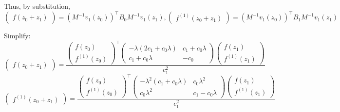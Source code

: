 \documentclass[]{article}
\newcommand{\pqty}[1]{{\left(#1\right)}}
\numberwithin{equation}{section}
\begin{document}
	Thus, by substitution,
	\begin{equation}
		\begin{pmatrix}
			f\pqty{z_0+z_1}
		\end{pmatrix}
		=\pqty{M^{-1} v_1\pqty{z_0}}^\top B_0 M^{-1} v_1\pqty{z_1}
		,
		\begin{pmatrix}
			f^\pqty{1}\pqty{z_0+z_1}
		\end{pmatrix}
		=\pqty{M^{-1} v_1\pqty{z_0}}^\top B_1 M^{-1} v_1\pqty{z_1}
	\end{equation}
	
	Simplify:
	\begin{equation}
		\begin{pmatrix}
			f\pqty{z_0+z_1}
		\end{pmatrix}
		=\frac{
		\begin{pmatrix}
			f\pqty{z_0} \\
			f^\pqty{1}\pqty{z_0}
		\end{pmatrix}^\top
		\begin{pmatrix}
			-\lambda\pqty{2 c_1+c_0 \lambda} & c_1+c_0 \lambda \\
			c_1+c_0 \lambda & -c_0
		\end{pmatrix}
		\begin{pmatrix}
			f\pqty{z_1} \\
			f^\pqty{1}\pqty{z_1}
		\end{pmatrix}}{c_1^2}
	\end{equation}
	\begin{equation}
		\begin{pmatrix}
			f^\pqty{1}\pqty{z_0+z_1}
		\end{pmatrix}
		=\frac{
		\begin{pmatrix}
			f\pqty{z_0} \\
			f^\pqty{1}\pqty{z_0}
		\end{pmatrix}^\top
		\begin{pmatrix}
			-\lambda^2\pqty{c_1+c_0\lambda} & c_0 \lambda^2 \\
			c_0 \lambda^2 & c_1-c_0\lambda
		\end{pmatrix}
		\begin{pmatrix}
			f\pqty{z_1} \\
			f^\pqty{1}\pqty{z_1}
		\end{pmatrix}}{c_1^2}
	\end{equation}
	
\end{document}
